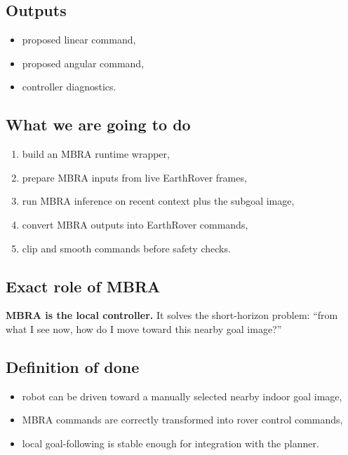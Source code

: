 \documentclass[11pt,a4paper]{article}
\begin{document}
\subsection{Outputs}

\begin{itemize}[nosep]
  \item proposed linear command,
  \item proposed angular command,
  \item controller diagnostics.
\end{itemize}

\subsection{What we are going to do}

\begin{enumerate}[nosep]
  \item build an MBRA runtime wrapper,
  \item prepare MBRA inputs from live EarthRover frames,
  \item run MBRA inference on recent context plus the subgoal image,
  \item convert MBRA outputs into EarthRover commands,
  \item clip and smooth commands before safety checks.
\end{enumerate}

\subsection{Exact role of MBRA}

\begin{mdframed}
\textbf{MBRA is the local controller.} It solves the short-horizon problem:
``from what I see now, how do I move toward this nearby goal image?''
\end{mdframed}

\subsection{Definition of done}

\begin{itemize}[nosep]
  \item robot can be driven toward a manually selected nearby indoor goal image,
  \item MBRA commands are correctly transformed into rover control commands,
  \item local goal-following is stable enough for integration with the planner.
\end{itemize}
\end{document}
